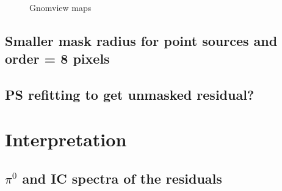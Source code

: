 \documentclass[a4paper]{article}
\begin{document}
\begin{figure}[H]
{\begin{subfigure}[b]{.5\textwidth}
	\end{subfigure}%
	}\\
\caption{Gnomview maps}
\label{Fit_IC_pi0_to_ROI}
\end{figure}






\newpage
\subsection{Smaller mask radius for point sources and order = 8 pixels}

\subsection{PS refitting to get unmasked residual?}


\section{Interpretation}

\subsection{$\pi^0$ and IC spectra of the residuals}
\end{document}
